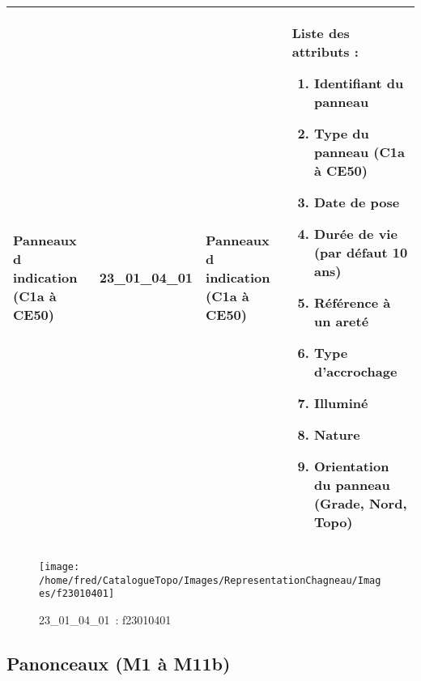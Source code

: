 \documentclass[12pt,titlepage]{book}
\begin{document}
\renewcommand{\arraystretch}{1.2}
\begin{supertabular}{|p{10cm}|c|p{13cm}|p{12cm}|}
 Panneaux d indication (C1a à CE50) & 23\_01\_04\_01 & Panneaux d indication (C1a à CE50) & Liste des attributs :
\begin{enumerate}
  \item Identifiant du panneau  \item Type du panneau (C1a à CE50)  \item Date de pose  \item Durée de vie (par défaut 10 ans)  \item Référence à un areté  \item Type d'accrochage  \item Illuminé  \item Nature  \item Orientation du panneau (Grade, Nord, Topo)\end{enumerate}
\\
\hline
\end{supertabular}
\begin{figure}[h!]
  \hfill         %
  \begin{minipage}[t]{3cm}
    \begin{center}
      \texttt{[image: /home/fred/CatalogueTopo/Images/RepresentationChagneau/Images/f23010401]}
      \caption[~23\_01\_04\_01]{\small{23\_01\_04\_01~:} \tiny{f23010401}}\label{f23010401}
    \end{center}
  \end{minipage}
\end{figure}


\subsection{Panonceaux (M1 à M11b)}
\noindent
\vspace{\baselineskip}
\end{document}
